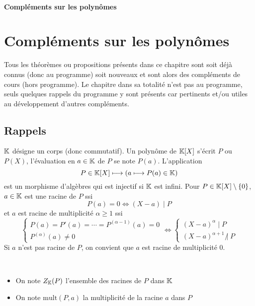 \ifsolo
~

\vspace{1cm}

\begin{center}
\textbf{\LARGE Compléments sur les polynômes} \\[1em]
\end{center}
\fi


\ifsolo
\tableofcontents
\else
\chapter{Compléments sur les polynômes}
\fi

Tous les théorèmes ou propositions présents dans ce chapitre sont soit déjà connus (donc au programme) soit nouveaux et sont alors des compléments de cours (hors programme). Le chapitre dans sa totalité n'est pas au programme, seuls quelques rappels du programme y sont présents car pertinents et/ou utiles au développement d'autres compléments.
\ifsolo
\else
\minitoc
\fi
\thispagestyle{empty}

\ifsolo \newpage \setcounter{page}{1} \fi
\section{Rappels}

$\mathbb K$ désigne un corps (donc commutatif). Un polynôme de $\mathbb K[X]$ s'écrit $P$ ou $P(X)$, l'évaluation en $a\in\mathbb K$ de $P$ se note $P(a)$. L'application \[
    P\in\mathbb K[X] \longmapsto (a\longmapsto P(a)\in\mathbb K)
\]
est un morphisme d'algèbres qui est injectif si $\mathbb K$ est infini. Pour $P\in\mathbb K[X]\setminus \{0\}$, $a\in\mathbb K$ est une racine de $P$ ssi \[
    P(a)=0\iff (X-a)\;|\;P
\]
et $a$ est racine de multiplicité $\alpha \geq 1$ ssi \[
    \begin{cases}
        P(a)=P'(a)=\cdots=P^{(\alpha - 1)}(a)=0 \\
        P^{(\alpha)}(a)\neq 0
    \end{cases}
    \iff \begin{cases}
        (X-a)^\alpha \; |\; P\\
        (X-a)^{\alpha+1}\;\not|\;P
    \end{cases}
\]
Si $a$ n'est pas racine de $P$, on convient que $a$ est racine de multiplicité $0$.

\begin{notation} ~
    \begin{itemize}
        \item
            On note $Z_\mathbb K(P)$ l'ensemble des racines de $P$ dans $\mathbb K$
        \item On note $\mathrm{mult}(P, a)$ la multiplicité de la racine $a$ dans $P$
    \end{itemize}
\end{notation}

